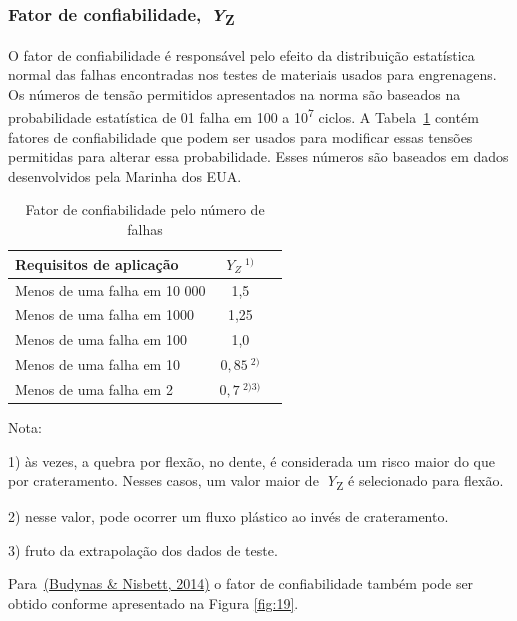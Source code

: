 \documentclass[12pt,a4paper]{article}
\begin{document}
\subsubsection*{\texorpdfstring{Fator de
confiabilidade,~\emph{Y}\textsubscript{Z}}{Fator de confiabilidade,~YZ}}

{\label{fator-de-confiabilidade-yz}}

O fator de confiabilidade é responsável pelo efeito da distribuição
estatística normal das falhas encontradas nos testes de materiais usados
para engrenagens. Os números de tensão permitidos apresentados na norma
são baseados na probabilidade estatística de 01 falha em 100 a
10\textsuperscript{7} ciclos. A Tabela~{\ref{tab:2}}
contém fatores de confiabilidade que podem ser usados para modificar
essas tensões permitidas para alterar essa probabilidade. Esses números
são baseados em dados desenvolvidos pela Marinha dos EUA.

\begin{table}[!htb]
\centering
\caption{{\label{tab:2} Fator de confiabilidade pelo número de falhas}}
\begin{tabular}{ l c c}
\hline
\textbf{Requisitos de aplicação}        &\textbf{$Y_Z \ ^{1)}$} \\ \hline
Menos de uma falha em 10 000            & 1,5       \\
Menos de uma falha em 1000              & 1,25      \\
Menos de uma falha em 100               & 1,0       \\
Menos de uma falha em 10                & $0,85\ ^{2)}$   \\
Menos de uma falha em 2                 & $0,7\ ^{2) 3)}$ \\
\hline
\end{tabular}
\end{table}

Nota:

1) às vezes, a quebra por flexão, no dente, é considerada um risco maior
do que por crateramento. Nesses casos, um valor maior
de~\emph{Y}\textsubscript{Z} é selecionado para flexão.

2) nesse valor, pode ocorrer um fluxo plástico ao invés de crateramento.

3) fruto da extrapolação dos dados de teste.

Para~\hyperref[csl:20]{(Budynas \& Nisbett, 2014)} o fator de confiabilidade também pode ser obtido
conforme apresentado na Figura {\ref{fig:19}}.
\end{document}
